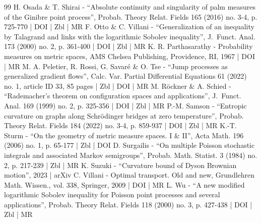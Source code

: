 \begin{thebibliography}{99}
H. Osada \& T. Shirai - “Absolute continuity and singularity of palm measures of the Ginibre point process”, Probab. Theory Relat. Fields 165 (2016) no. 3-4, p. 725-770 | DOI | Zbl | MR
F. Otto \& C. Villani - “Generalization of an inequality by Talagrand and links with the logarithmic Sobolev inequality”, J. Funct. Anal. 173 (2000) no. 2, p. 361-400 | DOI | Zbl | MR
K. R. Parthasarathy - Probability measures on metric spaces, AMS Chelsea Publishing, Providence, RI, 1967 | DOI | MR
M. A. Peletier, R. Rossi, G. Savaré \& O. Tse - “Jump processes as generalized gradient flows”, Calc. Var. Partial Differential Equations 61 (2022) no. 1, article ID 33, 85 pages | Zbl | DOI | MR
M. Röckner \& A. Schied - “Rademacher’s theorem on configuration spaces and applications”, J. Funct. Anal. 169 (1999) no. 2, p. 325-356 | DOI | Zbl | MR
P.-M. Samson - “Entropic curvature on graphs along Schrödinger bridges at zero temperature”, Probab. Theory Relat. Fields 184 (2022) no. 3-4, p. 859-937 | DOI | Zbl | MR
K.-T. Sturm - “On the geometry of metric measure spaces. I \& II”, Acta Math. 196 (2006) no. 1, p. 65-177 | Zbl | DOI
D. Surgailis - “On multiple Poisson stochastic integrals and associated Markov semigroups”, Probab. Math. Statist. 3 (1984) no. 2, p. 217-239 | Zbl | MR
K. Suzuki - “Curvature bound of Dyson Brownian motion”, 2023 | arXiv
C. Villani - Optimal transport. Old and new, Grundlehren Math. Wissen., vol. 338, Springer, 2009 | DOI | MR
L. Wu - “A new modified logarithmic Sobolev inequality for Poisson point processes and several applications”, Probab. Theory Relat. Fields 118 (2000) no. 3, p. 427-438 | DOI | Zbl | MR
\end{thebibliography}
